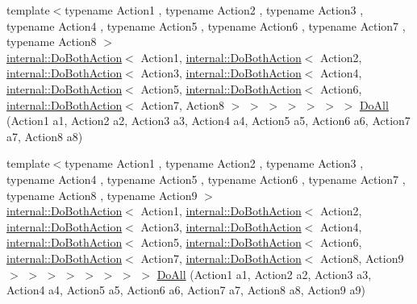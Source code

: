 \begin{DoxyCompactItemize}
\item 
{\footnotesize template$<$typename Action1 , typename Action2 , typename Action3 , typename Action4 , typename Action5 , typename Action6 , typename Action7 , typename Action8 $>$ }\\\mbox{\hyperlink{classtesting_1_1internal_1_1_do_both_action}{internal\+::\+Do\+Both\+Action}}$<$ Action1, \mbox{\hyperlink{classtesting_1_1internal_1_1_do_both_action}{internal\+::\+Do\+Both\+Action}}$<$ Action2, \mbox{\hyperlink{classtesting_1_1internal_1_1_do_both_action}{internal\+::\+Do\+Both\+Action}}$<$ Action3, \mbox{\hyperlink{classtesting_1_1internal_1_1_do_both_action}{internal\+::\+Do\+Both\+Action}}$<$ Action4, \mbox{\hyperlink{classtesting_1_1internal_1_1_do_both_action}{internal\+::\+Do\+Both\+Action}}$<$ Action5, \mbox{\hyperlink{classtesting_1_1internal_1_1_do_both_action}{internal\+::\+Do\+Both\+Action}}$<$ Action6, \mbox{\hyperlink{classtesting_1_1internal_1_1_do_both_action}{internal\+::\+Do\+Both\+Action}}$<$ Action7, Action8 $>$ $>$ $>$ $>$ $>$ $>$ $>$ \mbox{\hyperlink{namespacetesting_a2c0e69056a8e5bc4ddc2308ba0af5214}{Do\+All}} (Action1 a1, Action2 a2, Action3 a3, Action4 a4, Action5 a5, Action6 a6, Action7 a7, Action8 a8)
\item 
{\footnotesize template$<$typename Action1 , typename Action2 , typename Action3 , typename Action4 , typename Action5 , typename Action6 , typename Action7 , typename Action8 , typename Action9 $>$ }\\\mbox{\hyperlink{classtesting_1_1internal_1_1_do_both_action}{internal\+::\+Do\+Both\+Action}}$<$ Action1, \mbox{\hyperlink{classtesting_1_1internal_1_1_do_both_action}{internal\+::\+Do\+Both\+Action}}$<$ Action2, \mbox{\hyperlink{classtesting_1_1internal_1_1_do_both_action}{internal\+::\+Do\+Both\+Action}}$<$ Action3, \mbox{\hyperlink{classtesting_1_1internal_1_1_do_both_action}{internal\+::\+Do\+Both\+Action}}$<$ Action4, \mbox{\hyperlink{classtesting_1_1internal_1_1_do_both_action}{internal\+::\+Do\+Both\+Action}}$<$ Action5, \mbox{\hyperlink{classtesting_1_1internal_1_1_do_both_action}{internal\+::\+Do\+Both\+Action}}$<$ Action6, \mbox{\hyperlink{classtesting_1_1internal_1_1_do_both_action}{internal\+::\+Do\+Both\+Action}}$<$ Action7, \mbox{\hyperlink{classtesting_1_1internal_1_1_do_both_action}{internal\+::\+Do\+Both\+Action}}$<$ Action8, Action9 $>$ $>$ $>$ $>$ $>$ $>$ $>$ $>$ \mbox{\hyperlink{namespacetesting_a3479e234532d82d0a093f7ffdb3ac254}{Do\+All}} (Action1 a1, Action2 a2, Action3 a3, Action4 a4, Action5 a5, Action6 a6, Action7 a7, Action8 a8, Action9 a9)

\end{DoxyCompactItemize}
